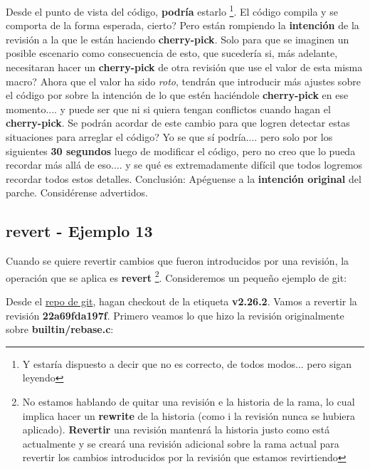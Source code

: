 Desde el punto de vista del código, {\bf podría} estarlo \footnote{Y estaría dispuesto a decir que no es correcto, de todos modos... pero
sigan leyendo}. El código compila y se comporta de la forma esperada, cierto? Pero están rompiendo la {\bf intención} de la revisión
a la que le están haciendo {\bf cherry-pick}. Solo para que se imaginen un posible escenario como consecuencia de esto, que sucedería
si, más adelante, necesitaran hacer un {\bf cherry-pick} de otra revisión que use el valor de esta misma macro? Ahora que el valor ha sido
{\it roto}, tendrán que introducir más ajustes sobre el código por sobre la intención de lo que estén haciéndole {\bf cherry-pick}
en ese momento.... y puede ser que ni si quiera tengan conflictos cuando hagan el {\bf cherry-pick}. Se podrán acordar de este cambio
para que logren detectar estas situaciones para arreglar el código? Yo se que sí podría.... pero solo por los siguientes
{\bf 30 segundos} luego de modificar el código, pero no creo que lo pueda recordar más allá de eso.... y se qué es extremadamente
difícil que todos logremos recordar todos estos detalles. Conclusión: Apéguense a la {\bf intención original} del parche.
Considérense advertidos.

\subsection{revert - Ejemplo 13}
\label{revert}
\label{example_13}

Cuando se quiere revertir cambios que fueron introducidos por una revisión, la operación que se aplica es {\bf revert}
\footnote{No estamos hablando de quitar una revisión e la historia de la rama, lo cual implica hacer un {\bf rewrite} de
la historia (como i la revisión nunca se hubiera aplicado). {\bf Revertir} una revisión mantenrá la historia justo como
está actualmente y se creará una revisión adicional sobre la rama actual para revertir los cambios introducidos por la
revisión que estamos revirtiendo}. Consideremos un pequeño ejemplo de git:

Desde el \hyperref[git_repo]{repo de git}, hagan checkout de la etiqueta {\bf v2.26.2}. Vamos a revertir la revisión {\bf 22a69fda197f}.
Primero veamos lo que hizo la revisión originalmente sobre {\bf builtin/rebase.c}:

